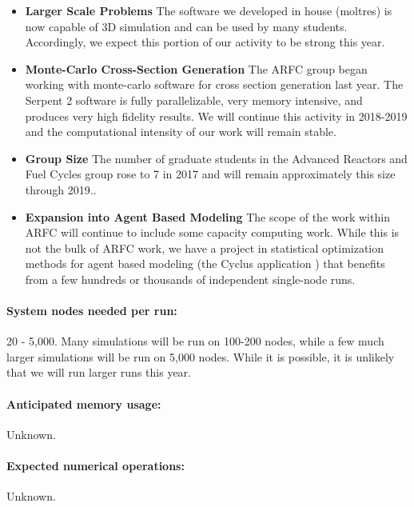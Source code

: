 \documentclass[letterpaper]{article}
\begin{document}
\begin{itemize}
        \item \textbf{Larger Scale Problems} The software we developed in house 
                (moltres) is now capable of 3D simulation and can be used by 
                many students. Accordingly, we expect this portion of our 
                activity to be strong this year.
        \item \textbf{Monte-Carlo Cross-Section Generation} The ARFC group 
                began working with monte-carlo software for cross section 
                generation last year. The Serpent 2 software is fully parallelizable, very 
                memory intensive, and produces very high fidelity results. 
                We will continue this activity in 2018-2019 and the computational 
                intensity of our work will remain stable.
\item \textbf{Group Size} The number of graduate students in the Advanced Reactors and Fuel Cycles
                group rose to 7 in 2017 and will remain approximately this size 
                through 2019..
        \item \textbf{Expansion into Agent Based Modeling} The scope of the 
                work within ARFC will continue to include some capacity 
                computing work. While this is not the bulk of ARFC work, we 
                have a project in statistical optimization methods for agent 
                based modeling (the Cyclus application 
                \cite{huff_fundamental_2016}) that benefits
                from a few hundreds or thousands of independent single-node 
                runs.  
\end{itemize}

\paragraph{System nodes needed per run:} 20 - 5,000. Many simulations will be 
run on 100-200 nodes, while a few much larger simulations will be run on 5,000 
nodes. While it is possible, it is unlikely that we will run larger runs 
this year.
\paragraph{Anticipated memory usage:} Unknown.
\paragraph{Expected numerical operations:} Unknown.
\end{document}
